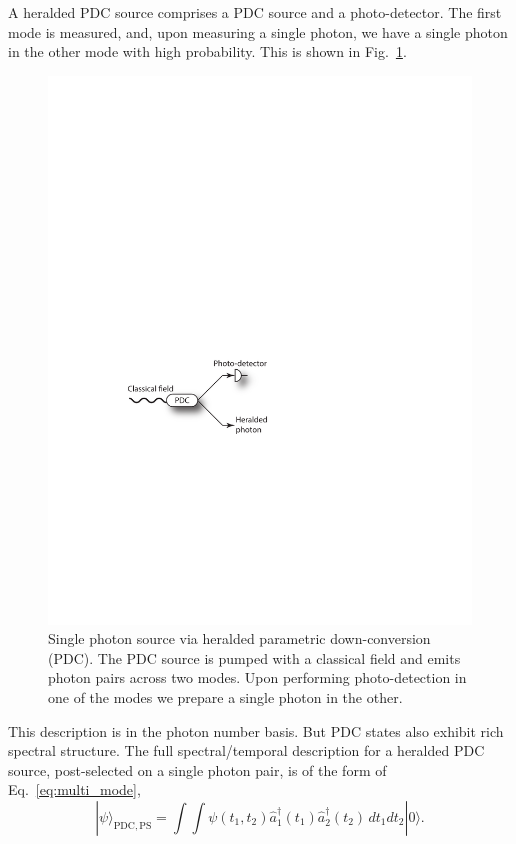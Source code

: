 \documentclass[aps,pra,twocolumn,amsmath,amssymb,color,superscriptaddress]{revtex4}
\newcommand{\ket}[1]{|#1\rangle}
\begin{document}
A heralded PDC source comprises a PDC source and a photo-detector. The first mode is measured, and, upon measuring a single photon, we have a single photon in the other mode with high probability. This is shown in Fig.~\ref{fig:PDC_source}.
\begin{figure}[!htb]
\includegraphics[width=0.6\columnwidth]{figures/PDC_source}
\caption{Single photon source via heralded parametric down-conversion (PDC). The PDC source is pumped with a classical field and emits photon pairs across two modes. Upon performing photo-detection in one of the modes we prepare a single photon in the other.} \label{fig:PDC_source}
\end{figure}

This description is in the photon number basis. But PDC states also exhibit rich spectral structure. The full spectral/temporal description for a heralded PDC source, post-selected on a single photon pair, is of the form of Eq.~\ref{eq:multi_mode},
\begin{equation} \label{eq:PDC_spectral}
\ket{\psi}_\mathrm{PDC,PS} = \int \!\! \int \psi(t_1,t_2) \hat{a}_1^\dag(t_1) \hat{a}_2^\dag(t_2)\,dt_1 dt_2 \ket{0}.
\end{equation}
\end{document}
